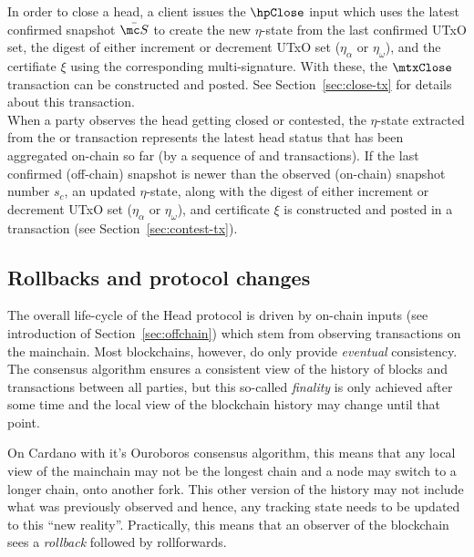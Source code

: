 \quad In order to close a head, a client issues the
$\hpClose$ input which uses the latest confirmed snapshot $\bar{\mc S}$ to
create the new $\eta$-state from the last confirmed UTxO set, the digest of
either increment or decrement UTxO set ($\eta_\alpha$ or $\eta_\omega$), and the certifiate
$\xi$ using the corresponding multi-signature. With these, the $\mtxClose$ transaction
can be constructed and posted. See Section~\ref{sec:close-tx} for details about this
transaction. \\

\quad When a party observes
the head getting closed or contested, the $\eta$-state extracted from the
\mtxClose{} or \mtxContest{} transaction represents the latest head status that
has been aggregated on-chain so far (by a sequence of \mtxClose{} and
\mtxContest{} transactions). If the last confirmed (off-chain) snapshot is newer
than the observed (on-chain) snapshot number $s_{c}$, an updated $\eta$-state,
along with the digest of either increment or decrement UTxO set ($\eta_\alpha$ or $\eta_\omega$),
and certificate $\xi$ is constructed and posted in a \mtxContest{} transaction (see
Section~\ref{sec:contest-tx}).

\subsection{Rollbacks and protocol changes}\label{sec:rollbacks}

The overall life-cycle of the Head protocol is driven by on-chain inputs (see
introduction of Section~\ref{sec:offchain}) which stem from observing
transactions on the mainchain. Most blockchains, however, do only provide
\emph{eventual} consistency. The consensus algorithm ensures a consistent view
of the history of blocks and transactions between all parties, but this
so-called \emph{finality} is only achieved after some time and the local view of
the blockchain history may change until that point.

On Cardano with it's Ouroboros consensus algorithm, this means that any local
view of the mainchain may not be the longest chain and a node may switch to a
longer chain, onto another fork. This other version of the history may not
include what was previously observed and hence, any tracking state needs to be
updated to this ``new reality''. Practically, this means that an observer of the
blockchain sees a \emph{rollback} followed by rollforwards.


